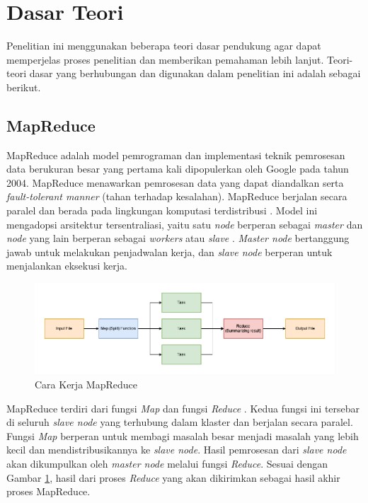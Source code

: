 \section{Dasar Teori}
Penelitian ini menggunakan beberapa teori dasar pendukung agar dapat memperjelas proses penelitian dan memberikan pemahaman lebih lanjut. Teori-teori dasar yang berhubungan dan digunakan dalam penelitian ini adalah sebagai berikut.

\subsection{MapReduce}
MapReduce adalah model pemrograman dan implementasi teknik pemrosesan data berukuran besar yang pertama kali dipopulerkan oleh Google pada tahun 2004\cite{kaliaAnalysisHadoopMapReduce2021}. MapReduce menawarkan pemrosesan data yang dapat diandalkan serta \textit{fault-tolerant manner} (tahan terhadap kesalahan).  MapReduce berjalan secara paralel dan berada pada lingkungan komputasi terdistribusi \cite{cTaskFailureResilience2020}. Model ini mengadopsi arsitektur tersentraliasi, yaitu satu \textit{node} berperan sebagai \textit{master} dan \textit{node} yang lain berperan sebagai \textit{workers} atau \textit{slave} \cite{herodotouHadoopPerformanceModels2011, bakratsasHadoopMapReducePerformance2018}. \textit{Master node} bertanggung jawab untuk melakukan penjadwalan kerja, dan \textit{slave node} berperan untuk menjalankan eksekusi kerja. 

\begin{figure}[h!]
    \centering
    \includegraphics[width=1\textwidth]{figures/ch02/mapreduce-scheme.png}
    \caption{Cara Kerja MapReduce}
    \label{fig:mapreduce-flow}
\end{figure}

MapReduce terdiri dari fungsi \textit{Map} dan fungsi \textit{Reduce} \cite{gandomiHybSMRPHybridScheduling2019}. Kedua fungsi ini tersebar di seluruh \textit{slave node} yang terhubung dalam klaster dan berjalan secara paralel. Fungsi \textit{Map} berperan untuk membagi masalah besar menjadi masalah yang lebih kecil dan mendistribusikannya ke \textit{slave node}. Hasil pemrosesan dari \textit{slave node} akan dikumpulkan oleh \textit{master node} melalui fungsi \textit{Reduce}. Sesuai dengan Gambar \ref{fig:mapreduce-flow}, hasil dari proses \textit{Reduce} yang akan dikirimkan sebagai hasil akhir proses MapReduce.  

